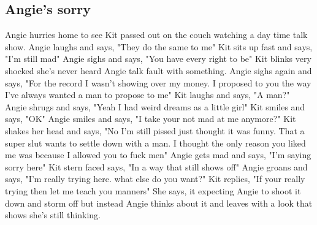 \documentclass{article}[12px] %
\begin{document}
\subsection* {Angie's sorry}
Angie hurries home to see Kit passed out on the couch watching a day time talk show. Angie laughs and says, "They do the same to me" Kit sits up fast and says, "I'm still mad" Angie sighs and says, "You have every right to be" Kit blinks very shocked she's never heard Angie talk fault with something. Angie sighs again and says, "For the record I wasn't showing over my money. I proposed to you the way I've always wanted a man to propose to me" Kit laughs and says, "A man?" Angie shrugs and says, "Yeah I had weird dreams as a little girl" Kit smiles and says, "OK" Angie smiles and says, "I take your not mad at me anymore?" Kit shakes her head and says, "No I'm still pissed just thought it was funny. That a super slut wants to settle down with a man. I thought the only reason you liked me was because I allowed you to fuck men" Angie gets mad and says, "I'm saying sorry here" Kit stern faced says, "In a way that still shows off" Angie groans and says, "I'm really trying here. what else do you want?" Kit replies, "If your really trying then let me teach you manners" She says, it expecting Angie to shoot it down and storm off but instead Angie thinks about it and leaves with a look that shows she's still thinking.\\
\end{document}
